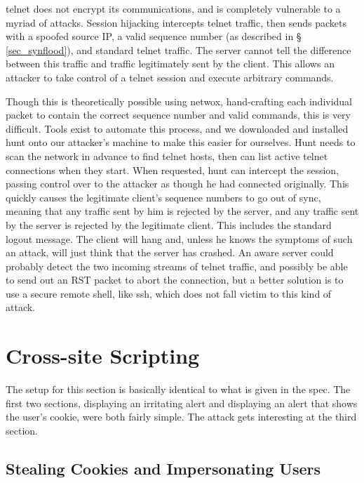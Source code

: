 telnet does not encrypt its communications, and is completely vulnerable to a myriad of attacks. Session hijacking
intercepts telnet traffic, then sends packets with a spoofed source IP, a valid sequence number (as described in \S
\ref{sec_synflood}), and standard telnet traffic. The server cannot tell the difference between this traffic and traffic
legitimately sent by the client. This allows an attacker to take control of a telnet session and execute arbitrary
commands.

Though this is theoretically possible using netwox, hand-crafting each individual packet to contain the correct sequence
number and valid commands, this is very difficult. Tools exist to automate this process, and we downloaded and installed
hunt onto our attacker's machine to make this easier for ourselves. Hunt needs to scan the network in advance to find
telnet hosts, then can list active telnet connections when they start. When requested, hunt can intercept the session,
passing control over to the attacker as though he had connected originally. This quickly causes the legitimate client's
sequence numbers to go out of sync, meaning that any traffic sent by him is rejected by the server, and any traffic sent
by the server is rejected by the legitimate client. This includes the standard logout message. The client will hang and,
unless he knows the symptoms of such an attack, will just think that the server has crashed. An aware server could
probably detect the two incoming streams of telnet traffic, and possibly be able to send out an RST packet to abort the
connection, but a better solution is to use a secure remote shell, like ssh, which does not fall victim to this kind of
attack.

\section{Cross-site Scripting}

The setup for this section is basically identical to what is given in the spec. The first two sections, displaying an
irritating alert and displaying an alert that shows the user's cookie, were both fairly simple. The attack gets
interesting at the third section.

\subsection{Stealing Cookies and Impersonating Users}

